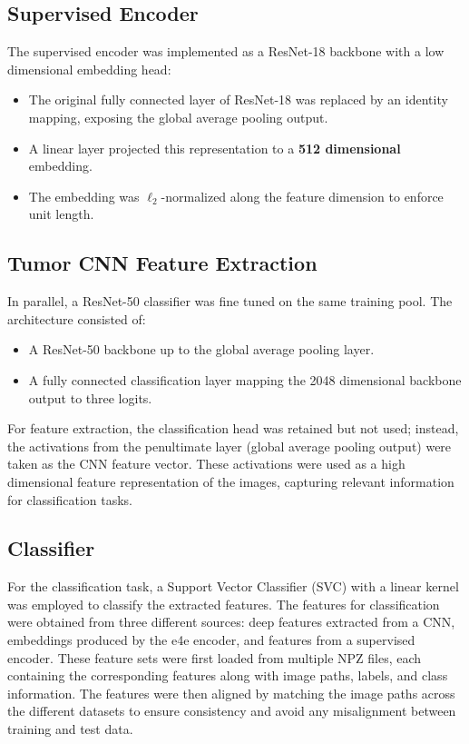 \subsection{Supervised Encoder}

The supervised encoder was implemented as a ResNet-18 backbone with a low dimensional embedding head:

\begin{itemize}
    \item The original fully connected layer of ResNet-18 was replaced by an identity mapping, exposing the global average pooling output.
    \item A linear layer projected this representation to a \textbf{512 dimensional} embedding.
    \item The embedding was $\ell_2$-normalized along the feature dimension to enforce unit length.
\end{itemize}

\subsection{Tumor CNN Feature Extraction}

In parallel, a ResNet-50 classifier was fine tuned on the same training pool. The architecture consisted of:

\begin{itemize}
    \item A ResNet-50 backbone up to the global average pooling layer.
    \item A fully connected classification layer mapping the 2048 dimensional backbone output to three logits.
\end{itemize}

For feature extraction, the classification head was retained but not used; instead, the activations from the penultimate layer (global average pooling output) were taken as the CNN feature vector. These activations were used as a high dimensional feature representation of the images, capturing relevant information for classification tasks.



\subsection{Classifier}

For the classification task, a Support Vector Classifier (SVC) with a linear kernel was employed to classify the extracted features. The features for classification were obtained from three different sources: deep features extracted from a CNN, embeddings produced by the e4e encoder, and features from a supervised encoder. These feature sets were first loaded from multiple NPZ files, each containing the corresponding features along with image paths, labels, and class information. The features were then aligned by matching the image paths across the different datasets to ensure consistency and avoid any misalignment between training and test data.\\

